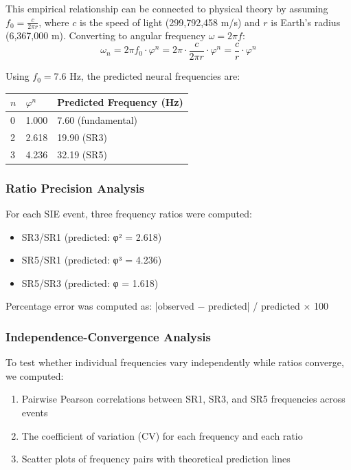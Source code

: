 \documentclass[11pt,a4paper]{article}
\begin{document}
This empirical relationship can be connected to physical theory by assuming $f_0 = \frac{c}{2\pi r}$, where $c$ is the speed of light (299,792,458 m/s) and $r$ is Earth's radius (6,367,000 m). Converting to angular frequency $\omega = 2\pi f$:
\begin{equation}
    \omega_n = 2\pi f_0 \cdot \varphi^n = 2\pi \cdot \frac{c}{2\pi r} \cdot \varphi^n = \frac{c}{r} \cdot \varphi^n
\end{equation}

Using $f_0 = 7.6$ Hz, the predicted neural frequencies are:
\begin{table}[H]
    \centering

    \begin{tabular}{lll}
        \toprule
        $n$ & $\varphi^n$ & Predicted Frequency (Hz) \\
        \midrule
        0 & 1.000 & 7.60 (fundamental) \\
        2 & 2.618 & 19.90 (SR3) \\
        3 & 4.236 & 32.19 (SR5) \\
        \bottomrule
    \end{tabular}
\end{table}
\subsubsection{Ratio Precision Analysis}

For each SIE event, three frequency ratios were computed:
\begin{itemize}
\item SR3/SR1 (predicted: φ² = 2.618)
\item SR5/SR1 (predicted: φ³ = 4.236)
\item SR5/SR3 (predicted: φ = 1.618)
\end{itemize}

Percentage error was computed as: |observed − predicted| / predicted × 100

\subsubsection{Independence-Convergence Analysis}
To test whether individual frequencies vary independently while ratios converge, we computed:
\begin{enumerate}
\item Pairwise Pearson correlations between SR1, SR3, and SR5 frequencies across events
\item The coefficient of variation (CV) for each frequency and each ratio
\item Scatter plots of frequency pairs with theoretical prediction lines
\end{enumerate}
\end{document}
